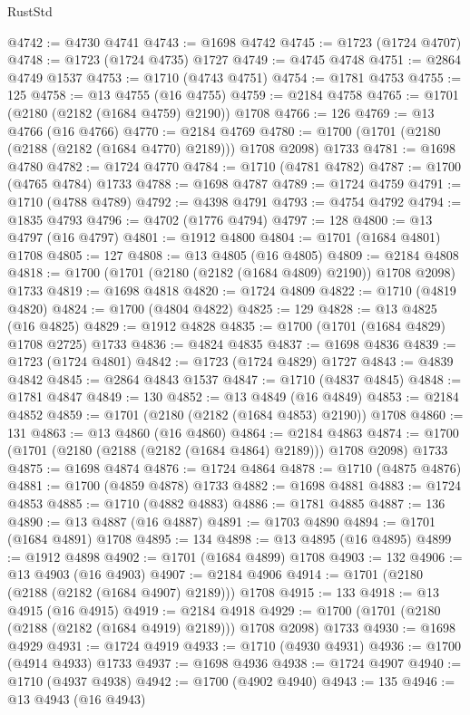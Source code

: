 \begin{lexlean}{RustStd}
\begin{coremodule}
@4742 := @4730 @4741
@4743 := @1698 @4742
@4745 := @1723 (@1724 @4707)
@4748 := @1723 (@1724 @4735) @1727
@4749 := @4745 @4748
@4751 := @2864 @4749 @1537
@4753 := @1710 (@4743 @4751)
@4754 := @1781 @4753
@4755 := 125
@4758 := @13 @4755 (@16 @4755)
@4759 := @2184 @4758
@4765 := @1701 (@2180 (@2182 (@1684 @4759) @2190)) @1708
@4766 := 126
@4769 := @13 @4766 (@16 @4766)
@4770 := @2184 @4769
@4780 := @1700 (@1701 (@2180 (@2188 (@2182 (@1684 @4770) @2189))) @1708 @2098) @1733
@4781 := @1698 @4780
@4782 := @1724 @4770
@4784 := @1710 (@4781 @4782)
@4787 := @1700 (@4765 @4784) @1733
@4788 := @1698 @4787
@4789 := @1724 @4759
@4791 := @1710 (@4788 @4789)
@4792 := @4398 @4791
@4793 := @4754 @4792
@4794 := @1835 @4793
@4796 := @4702 (@1776 @4794)
@4797 := 128
@4800 := @13 @4797 (@16 @4797)
@4801 := @1912 @4800
@4804 := @1701 (@1684 @4801) @1708
@4805 := 127
@4808 := @13 @4805 (@16 @4805)
@4809 := @2184 @4808
@4818 := @1700 (@1701 (@2180 (@2182 (@1684 @4809) @2190)) @1708 @2098) @1733
@4819 := @1698 @4818
@4820 := @1724 @4809
@4822 := @1710 (@4819 @4820)
@4824 := @1700 (@4804 @4822)
@4825 := 129
@4828 := @13 @4825 (@16 @4825)
@4829 := @1912 @4828
@4835 := @1700 (@1701 (@1684 @4829) @1708 @2725) @1733
@4836 := @4824 @4835
@4837 := @1698 @4836
@4839 := @1723 (@1724 @4801)
@4842 := @1723 (@1724 @4829) @1727
@4843 := @4839 @4842
@4845 := @2864 @4843 @1537
@4847 := @1710 (@4837 @4845)
@4848 := @1781 @4847
@4849 := 130
@4852 := @13 @4849 (@16 @4849)
@4853 := @2184 @4852
@4859 := @1701 (@2180 (@2182 (@1684 @4853) @2190)) @1708
@4860 := 131
@4863 := @13 @4860 (@16 @4860)
@4864 := @2184 @4863
@4874 := @1700 (@1701 (@2180 (@2188 (@2182 (@1684 @4864) @2189))) @1708 @2098) @1733
@4875 := @1698 @4874
@4876 := @1724 @4864
@4878 := @1710 (@4875 @4876)
@4881 := @1700 (@4859 @4878) @1733
@4882 := @1698 @4881
@4883 := @1724 @4853
@4885 := @1710 (@4882 @4883)
@4886 := @1781 @4885
@4887 := 136
@4890 := @13 @4887 (@16 @4887)
@4891 := @1703 @4890
@4894 := @1701 (@1684 @4891) @1708
@4895 := 134
@4898 := @13 @4895 (@16 @4895)
@4899 := @1912 @4898
@4902 := @1701 (@1684 @4899) @1708
@4903 := 132
@4906 := @13 @4903 (@16 @4903)
@4907 := @2184 @4906
@4914 := @1701 (@2180 (@2188 (@2182 (@1684 @4907) @2189))) @1708
@4915 := 133
@4918 := @13 @4915 (@16 @4915)
@4919 := @2184 @4918
@4929 := @1700 (@1701 (@2180 (@2188 (@2182 (@1684 @4919) @2189))) @1708 @2098) @1733
@4930 := @1698 @4929
@4931 := @1724 @4919
@4933 := @1710 (@4930 @4931)
@4936 := @1700 (@4914 @4933) @1733
@4937 := @1698 @4936
@4938 := @1724 @4907
@4940 := @1710 (@4937 @4938)
@4942 := @1700 (@4902 @4940)
@4943 := 135
@4946 := @13 @4943 (@16 @4943)

\end{coremodule}
\end{lexlean}
